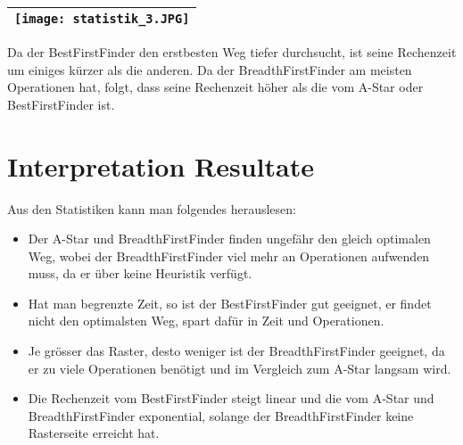 \begin{longtable}[]{@{}l@{}}
\toprule
\endhead
\texttt{[image: statistik\_3.JPG]}\tabularnewline
\bottomrule
\end{longtable}

Da der BestFirstFinder den erstbesten Weg tiefer durchsucht, ist seine
Rechenzeit um einiges kürzer als die anderen. Da der
BreadthFirstFinder am meisten Operationen hat, folgt, dass
seine Rechenzeit höher als die vom A-Star oder BestFirstFinder ist.

\section{Interpretation Resultate}

Aus den Statistiken kann man folgendes herauslesen:

\begin{itemize}
\item
  Der A-Star und BreadthFirstFinder finden ungefähr den gleich optimalen Weg,
  wobei der BreadthFirstFinder viel mehr an Operationen aufwenden muss,
  da er über keine Heuristik verfügt.
\item
  Hat man begrenzte Zeit, so ist der BestFirstFinder gut geeignet, er
  findet nicht den optimalsten Weg, spart dafür in Zeit und Operationen.
\item
  Je grösser das Raster, desto weniger ist der BreadthFirstFinder
  geeignet, da er zu viele Operationen benötigt und im Vergleich zum A-Star langsam wird.
\item
  Die Rechenzeit vom BestFirstFinder steigt linear und die vom
  A-Star und BreadthFirstFinder exponential, solange der
  BreadthFirstFinder keine Rasterseite erreicht hat.
\end{itemize}


